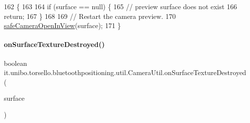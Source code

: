 \begin{DoxyCode}
162                                                                                                \{
163 
164         \textcolor{keywordflow}{if} (surface == null) \{
165             \textcolor{comment}{// preview surface does not exist}
166             \textcolor{keywordflow}{return};
167         \}
168 
169         \textcolor{comment}{// Restart the camera preview.}
170         \hyperlink{classit_1_1unibo_1_1torsello_1_1bluetoothpositioning_1_1util_1_1CameraUtil_af983e424981a3991fd9d241217328bc8_af983e424981a3991fd9d241217328bc8}{safeCameraOpenInView}(surface);
171     \}
\end{DoxyCode}
\hypertarget{classit_1_1unibo_1_1torsello_1_1bluetoothpositioning_1_1util_1_1CameraUtil_a0189f59aac3827e05165a29cc8658d95_a0189f59aac3827e05165a29cc8658d95}{}\label{classit_1_1unibo_1_1torsello_1_1bluetoothpositioning_1_1util_1_1CameraUtil_a0189f59aac3827e05165a29cc8658d95_a0189f59aac3827e05165a29cc8658d95} 
\paragraph{\texorpdfstring{on\+Surface\+Texture\+Destroyed()}{onSurfaceTextureDestroyed()}}
{\footnotesize\ttfamily boolean it.\+unibo.\+torsello.\+bluetoothpositioning.\+util.\+Camera\+Util.\+on\+Surface\+Texture\+Destroyed (\begin{DoxyParamCaption}\item[{Surface\+Texture}]{surface }\end{DoxyParamCaption})}


